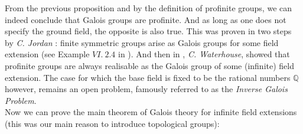 \documentclass{article}
\theoremstyle{plain}
\theoremstyle{definition}
\begin{document}
\noindent From the previous proposition and by the definition of profinite groups, we can indeed conclude that Galois groups are profinite.
And as long as one does not specify the ground field, the opposite is also true. 
This was proven in two steps by \textit{C. Jordan} : finite symmetric groups arise as Galois groups for some field extension (see Example $VI.\:2.4$ in \cite{Lang_algebra}). And then in \cite{profinite_waterhouse}, \textit{C. Waterhouse}, showed that profinite groups are always realisable as the Galois group of some (infinite) field extension.
The case for which the base field is fixed to be the rational numbers $\mathbb{Q}$ however, remains an open problem, famously referred to as the \textit{Inverse Galois Problem}.\\


\noindent Now we can prove the main theorem of Galois theory for infinite field extensions (this was our main reason to introduce topological groups):
\end{document}
